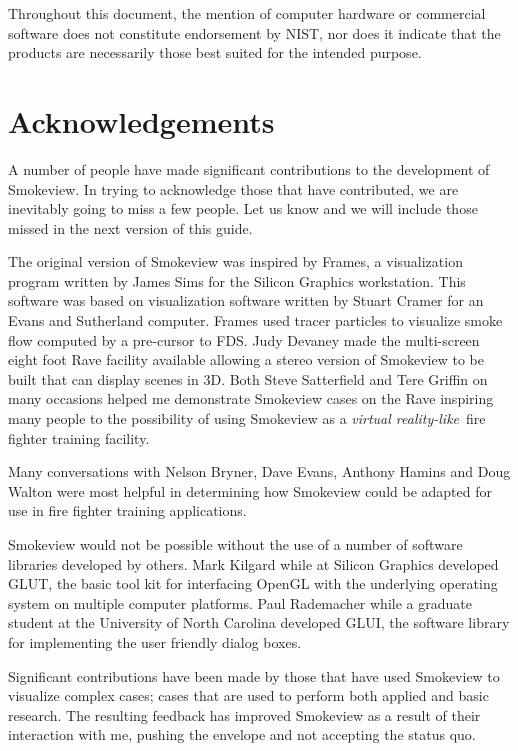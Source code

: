 \documentclass[11pt,twoside]{book}
\begin{document}
Throughout this document, the mention of computer hardware or
commercial software does not constitute endorsement by NIST,
nor does
it indicate that the products are necessarily those
best suited for the
intended purpose.


\chapter*{Acknowledgements}
A number of people have made significant contributions to the
development of Smokeview. In trying to acknowledge those that have
contributed, we are inevitably going to miss a few people.  Let us
know and we will include those missed in the next version of this
guide.

The original version of Smokeview was inspired by Frames, a
visualization program written by James Sims for the Silicon
Graphics workstation.  This software was based on visualization
software written by Stuart Cramer for an Evans and Sutherland
computer. Frames used tracer particles to visualize smoke flow
computed by a pre-cursor to FDS. Judy Devaney made the
multi-screen eight foot Rave facility available allowing a stereo
version of Smokeview to be built that can display scenes in
3D.  Both Steve Satterfield and Tere Griffin on many occasions
helped me demonstrate Smokeview cases on the Rave inspiring many
people to the possibility of using Smokeview as a {\em virtual
reality-like}\ fire fighter training facility.

Many conversations with Nelson Bryner, Dave Evans, Anthony Hamins
and Doug Walton were most helpful in determining how Smokeview
could be adapted for use in fire fighter training applications.

Smokeview would not be possible without the use of a number of
software libraries developed by others.  Mark Kilgard while at
Silicon Graphics developed GLUT, the basic tool kit for
interfacing OpenGL with the underlying operating system on
multiple computer platforms. Paul Rademacher while a graduate
student at the University of North Carolina developed GLUI, the
software library for implementing the user friendly dialog boxes.

Significant contributions have been made by those that have used
Smokeview to visualize complex cases; cases that are used to
perform both applied and basic research.  The resulting feedback
has improved Smokeview as a result of their interaction with me,
pushing the envelope and not accepting the status quo.
\end{document}

